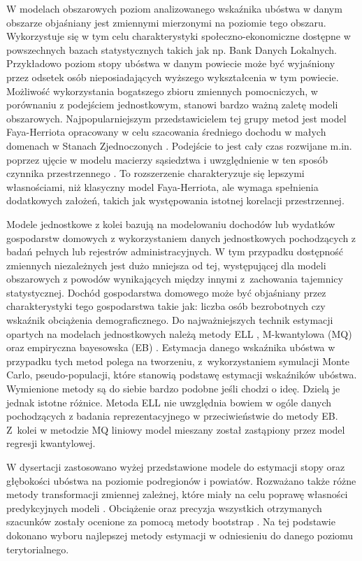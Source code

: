 W modelach obszarowych poziom analizowanego wskaźnika ubóstwa w danym obszarze objaśniany jest zmiennymi mierzonymi na poziomie tego obszaru. Wykorzystuje się w tym celu charakterystyki społeczno-ekonomiczne dostępne w powszechnych bazach statystycznych takich jak np. Bank Danych Lokalnych. Przykładowo poziom stopy ubóstwa w danym powiecie może być wyjaśniony przez odsetek osób nieposiadających wyższego wykształcenia w tym powiecie. Możliwość wykorzystania bogatszego zbioru zmiennych pomocniczych, w porównaniu z podejściem jednostkowym, stanowi bardzo ważną zaletę modeli obszarowych. Najpopularniejszym przedstawicielem tej grupy metod jest model Faya-Herriota opracowany w celu szacowania średniego dochodu w małych domenach w Stanach Zjednoczonych \citep{fh1979}. Podejście to jest cały czas rozwijane m.in. poprzez ujęcie w modelu macierzy sąsiedztwa i uwzględnienie w ten sposób czynnika przestrzennego \citep{pratesi2008}. To rozszerzenie charakteryzuje się lepszymi własnościami, niż klasyczny model Faya-Herriota, ale wymaga spełnienia dodatkowych założeń, takich jak występowania istotnej korelacji przestrzennej.

Modele jednostkowe z kolei bazują na modelowaniu dochodów lub wydatków gospodarstw domowych z wykorzystaniem danych jednostkowych pochodzących z badań pełnych lub rejestrów administracyjnych. W tym przypadku dostępność zmiennych niezależnych jest dużo mniejsza od tej, występującej dla modeli obszarowych z powodów wynikających między innymi z~zachowania tajemnicy statystycznej. Dochód gospodarstwa domowego może być objaśniany przez charakterystyki tego gospodarstwa takie jak: liczba osób bezrobotnych czy wskaźnik obciążenia demograficznego. Do najważniejszych technik estymacji opartych na modelach jednostkowych należą metody ELL \citep{ell2003}, M-kwantylowa (MQ) \citep{mq2006} oraz empiryczna bayesowska (EB) \citep{ebp2010}. Estymacja danego wskaźnika ubóstwa w przypadku tych metod polega na tworzeniu, z~wykorzystaniem symulacji Monte Carlo, pseudo-populacji, które stanowią podstawę estymacji wskaźników ubóstwa. Wymienione metody są do siebie bardzo podobne jeśli chodzi o ideę. Dzielą je jednak istotne różnice. Metoda ELL nie uwzględnia bowiem w ogóle danych pochodzących z badania reprezentacyjnego w przeciwieństwie do metody EB. Z~kolei w metodzie MQ liniowy model mieszany został zastąpiony przez model regresji kwantylowej.

W dysertacji zastosowano wyżej przedstawione modele do estymacji stopy oraz głębokości ubóstwa na poziomie podregionów i powiatów. Rozważano także różne metody transformacji zmiennej zależnej, które miały na celu poprawę własności predykcyjnych modeli \citep{analpovdata52016}. Obciążenie oraz precyzja wszystkich otrzymanych szacunków zostały ocenione za pomocą metody bootstrap \citep{gonzales2008}. Na tej podstawie dokonano wyboru najlepszej metody estymacji w odniesieniu do danego poziomu terytorialnego.

